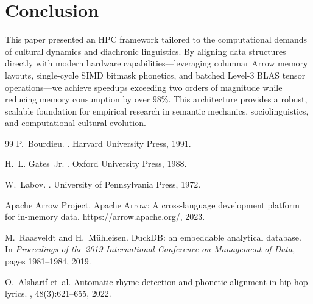 \documentclass[11pt,a4paper]{article}
\begin{document}
\section{Conclusion}
This paper presented an HPC framework tailored to the computational demands of cultural dynamics and diachronic linguistics. By aligning data structures directly with modern hardware capabilities—leveraging columnar Arrow memory layouts, single-cycle SIMD bitmask phonetics, and batched Level-3 BLAS tensor operations—we achieve speedups exceeding two orders of magnitude while reducing memory consumption by over $98\%$. This architecture provides a robust, scalable foundation for empirical research in semantic mechanics, sociolinguistics, and computational cultural evolution.

\begin{thebibliography}{99}
P.~Bourdieu.
.
\newblock Harvard University Press, 1991.

H.~L. Gates~Jr.
.
\newblock Oxford University Press, 1988.

W.~Labov.
.
\newblock University of Pennsylvania Press, 1972.

Apache Arrow Project.
\newblock Apache Arrow: A cross-language development platform for in-memory data.
\newblock \url{https://arrow.apache.org/}, 2023.

M.~Raasveldt and H.~M{\"u}hleisen.
\newblock DuckDB: an embeddable analytical database.
\newblock In {\em Proceedings of the 2019 International Conference on Management of Data}, pages 1981--1984, 2019.

O.~Alsharif et~al.
\newblock Automatic rhyme detection and phonetic alignment in hip-hop lyrics.
, 48(3):621--655, 2022.
\end{thebibliography}
\end{document}
